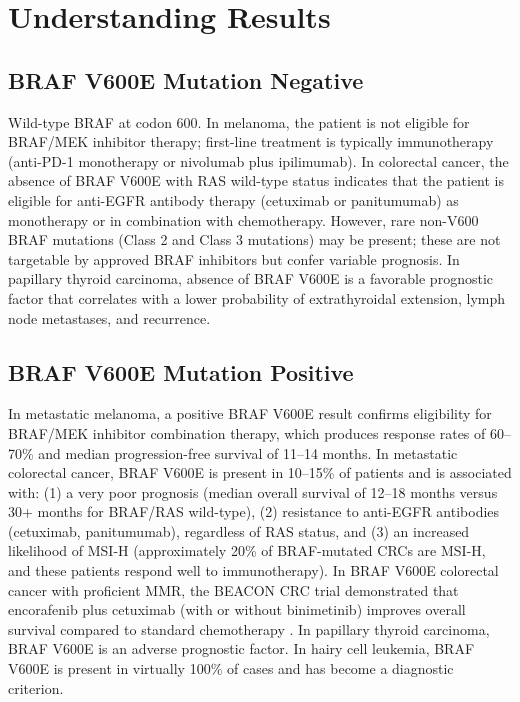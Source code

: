 \section*{Understanding Results}

\subsection*{BRAF V600E Mutation Negative}
Wild-type BRAF at codon 600. In melanoma, the patient is not eligible for BRAF/MEK inhibitor therapy; first-line treatment is typically immunotherapy (anti-PD-1 monotherapy or nivolumab plus ipilimumab). In colorectal cancer, the absence of BRAF V600E with RAS wild-type status indicates that the patient is eligible for anti-EGFR antibody therapy (cetuximab or panitumumab) as monotherapy or in combination with chemotherapy. However, rare non-V600 BRAF mutations (Class 2 and Class 3 mutations) may be present; these are not targetable by approved BRAF inhibitors but confer variable prognosis. In papillary thyroid carcinoma, absence of BRAF V600E is a favorable prognostic factor that correlates with a lower probability of extrathyroidal extension, lymph node metastases, and recurrence.

\subsection*{BRAF V600E Mutation Positive}
In metastatic melanoma, a positive BRAF V600E result confirms eligibility for BRAF/MEK inhibitor combination therapy, which produces response rates of 60--70\% and median progression-free survival of 11--14 months. In metastatic colorectal cancer, BRAF V600E is present in 10--15\% of patients and is associated with: (1) a very poor prognosis (median overall survival of 12--18 months versus 30+ months for BRAF/RAS wild-type), (2) resistance to anti-EGFR antibodies (cetuximab, panitumumab), regardless of RAS status, and (3) an increased likelihood of MSI-H (approximately 20\% of BRAF-mutated CRCs are MSI-H, and these patients respond well to immunotherapy). In BRAF V600E colorectal cancer with proficient MMR, the BEACON CRC trial demonstrated that encorafenib plus cetuximab (with or without binimetinib) improves overall survival compared to standard chemotherapy \cite{kopetz2019encorafenib}. In papillary thyroid carcinoma, BRAF V600E is an adverse prognostic factor. In hairy cell leukemia, BRAF V600E is present in virtually 100\% of cases and has become a diagnostic criterion.

